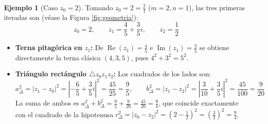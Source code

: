 \documentclass[11pt,a4paper]{article}
\theoremstyle{plain}
\theoremstyle{definition}
\newtheorem{ejemplo}{Ejemplo}
\begin{document}
\begin{ejemplo}[Caso $z_0 = 2$]
Tomando $z_0 = 2 = \frac{2}{1}$ ($m=2, n=1$), las tres primeras iteradas son (véase la Figura \ref{fig:geometria}):
\[
z_0 = 2, \qquad z_1 = \frac{4}{5} + \frac{3}{5}i, \qquad z_2 = \frac{1}{2}
\]
\begin{itemize}
    \item \textbf{Terna pitagórica en $z_1$:} De $\operatorname{Re}(z_1) = \frac{4}{5}$ e $\operatorname{Im}(z_1) = \frac{3}{5}$ se obtiene directamente la terna clásica $(4, 3, 5)$, pues $4^2 + 3^2 = 5^2$.
    \item \textbf{Triángulo rectángulo $\triangle z_0 z_1 z_2$:} Los cuadrados de los lados son:
    \[
    a_{\Delta}^2 = |z_1 - z_0|^2 = \left|-\frac{6}{5} + \frac{3}{5}i\right|^2 = \frac{45}{25} = \frac{9}{5}, \qquad
    b_{\Delta}^2 = |z_1 - z_2|^2 = \left|\frac{3}{10} + \frac{3}{5}i\right|^2 = \frac{45}{100} = \frac{9}{20}
    \]
    La suma de ambos es $a_{\Delta}^2 + b_{\Delta}^2 = \frac{9}{5} + \frac{9}{20} = \frac{45}{20} = \frac{9}{4}$, que coincide exactamente con el cuadrado de la hipotenusa $c_{\Delta}^2 = |z_0 - z_2|^2 = \left(2 - \frac{1}{2}\right)^2 = \left(\frac{3}{2}\right)^2 = \frac{9}{4}$.
\end{itemize}
\end{ejemplo}
\end{document}
